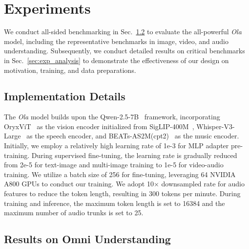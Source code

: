 \section{Experiments}
\label{sec:exp}



We conduct all-sided benchmarking in Sec.~\ref{sec:exp_main}  to evaluate the all-powerful \textit{Ola} model, including the representative benchmarks in image, video, and audio understanding. Subsequently, we conduct detailed results on critical benchmarks in Sec.~\ref{sec:exp_analysis} to demonstrate the effectiveness of our design on motivation, training, and data preparations. 

\subsection{Implementation Details}

The \textit{Ola} model builds upon the Qwen-2.5-7B~\citep{qwen2.5} framework, incorporating OryxViT~\citep{liu2024oryx} as the vision encoder initialized from SigLIP-400M~\citep{zhai2023siglip}, Whisper-V3-Large~\citep{radford2022whisper} as the speech encoder, and BEATs-AS2M(cpt2)~\citep{Chen2022beats} as the music encoder. Initially, we employ a relatively high learning rate of 1e-3 for MLP adapter pre-training. During supervised fine-tuning, the learning rate is gradually reduced from 2e-5 for text-image and multi-image training to 1e-5 for video-audio training. We utilize a batch size of 256 for fine-tuning, leveraging 64 NVIDIA A800 GPUs to conduct our training. We adopt 10$\times$ downsampled rate for audio features to reduce the token length, resulting in 300 tokens per minute. During training and inference, the maximum token length is set to 16384 and the maximum number of audio trunks is set to 25. 

\subsection{Results on Omni Understanding} \label{sec:exp_main}

